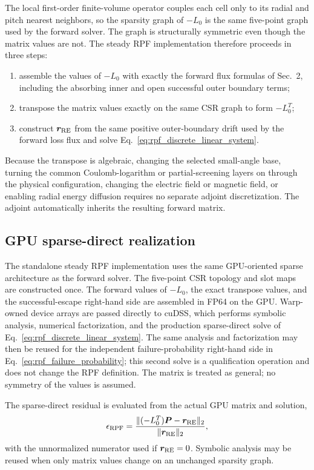 \documentclass[11pt]{article}
\begin{document}
The local first-order finite-volume operator couples each cell only to its radial and
pitch nearest neighbors, so the sparsity graph of $-L_0$ is the same five-point graph
used by the forward solver.  The graph is structurally symmetric even though the matrix
values are not.  The steady RPF implementation therefore proceeds in three steps:
\begin{enumerate}
 \item assemble the values of $-L_0$ with exactly the forward flux formulas of
       Sec.~2, including the absorbing inner and open successful outer boundary terms;
 \item transpose the matrix values exactly on the same CSR graph to form $-L_0^T$;
 \item construct $\bm r_{\rm RE}$ from the same positive outer-boundary drift used by
       the forward loss flux and solve Eq.~\eqref{eq:rpf_discrete_linear_system}.
\end{enumerate}
Because the transpose is algebraic, changing the selected small-angle base, turning the
common Coulomb-logarithm or partial-screening layers on through the physical
configuration, changing the electric field or magnetic field, or enabling radial energy
diffusion requires no separate adjoint discretization.  The adjoint automatically
inherits the resulting forward matrix.

\subsection{GPU sparse-direct realization}
\label{sec:rpf_gpu_solve}

The standalone steady RPF implementation uses the same GPU-oriented sparse architecture
as the forward solver.  The five-point CSR topology and slot maps are constructed once.
The forward values of $-L_0$, the exact transpose values, and the successful-escape
right-hand side are assembled in FP64 on the GPU.  Warp-owned device arrays are passed
directly to cuDSS, which performs symbolic analysis, numerical factorization, and the
production sparse-direct solve of Eq.~\eqref{eq:rpf_discrete_linear_system}.  The same
analysis and factorization may then be reused for the independent failure-probability
right-hand side in Eq.~\eqref{eq:rpf_failure_probability}; this second solve is a
qualification operation and does not change the RPF definition.  The matrix is treated
as general; no symmetry of the values is assumed.

The sparse-direct residual is evaluated from the actual GPU matrix and solution,
\begin{equation}
 \epsilon_{\rm RPF}
 =\frac{\|(-L_0^T)\bm P-\bm r_{\rm RE}\|_2}
        {\|\bm r_{\rm RE}\|_2},
 \label{eq:rpf_linear_residual}
\end{equation}
with the unnormalized numerator used if $\bm r_{\rm RE}=0$.  Symbolic analysis may be
reused when only matrix values change on an unchanged sparsity graph.
\end{document}
